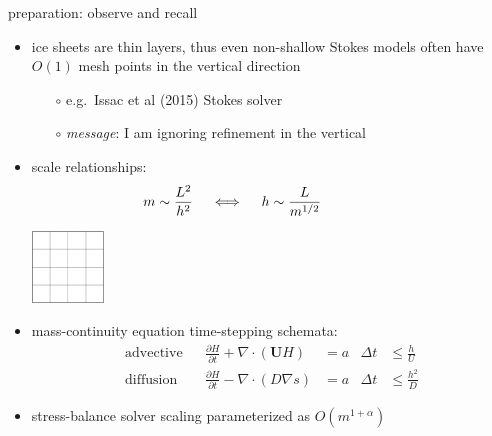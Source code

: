 \documentclass[svgnames,
               hyperref={colorlinks,citecolor=DeepPink4,linkcolor=FireBrick,urlcolor=Maroon},
               usepdftitle=false]  %
               {beamer}
\newcommand{\grad}{\nabla}
\newcommand{\bU}{\mathbf{U}}
\begin{document}
\begin{frame}{preparation: observe and recall}

\begin{itemize}
\item ice sheets are thin layers, thus even non-shallow Stokes models often have $O(1)$ mesh points in the vertical direction
    \begin{itemize}
    \item[$\circ$] e.g.~Issac et al (2015) Stokes solver
    \item[$\circ$] \emph{message}: I am ignoring refinement in the vertical
    \end{itemize}

\medskip
\item scale relationships:
  $$m \sim \frac{L^2}{h^2}  \quad \iff \quad h \sim \frac{L}{m^{1/2}} \hspace{20mm}$$

\vspace{-18mm}
\hfill \includegraphics[width=0.15\textwidth]{images/one-grid.png} \hspace{5mm}

\medskip
\item mass-continuity equation time-stepping schemata:
{\footnotesize
\begin{align*}
\text{advective} && \frac{\partial H}{\partial t} + \nabla \cdot \left(\bU H\right) &= a & \Delta t &\le \frac{h}{U} \\
\text{diffusion} && \frac{\partial H}{\partial t} - \nabla \cdot \left(D \grad s\right) &= a & \Delta t &\le \frac{h^2}{D}
\end{align*}
}


\item stress-balance solver scaling parameterized as $O(m^{1+\alpha})$
\end{itemize}
\end{frame}
\end{document}
